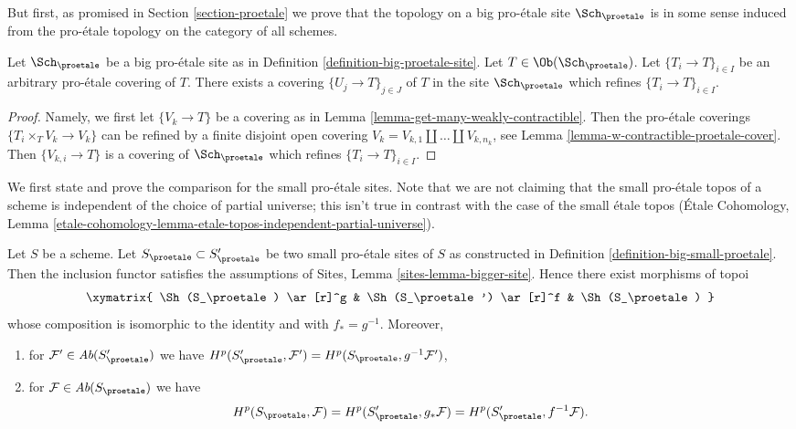 \medskip\noindent
But first, 
as promised in Section \ref{section-proetale} we prove that the topology on a
big pro-\'etale site $\Sch_\proetale$ is in some sense induced from
the pro-\'etale topology on the category of all schemes.

\begin{lemma}
\label{lemma-proetale-induced}
Let $\Sch_\proetale$ be a big pro-\'etale site as in
Definition \ref{definition-big-proetale-site}.
Let $T \in \Ob(\Sch_\proetale)$.
Let $\{T_i \to T\}_{i \in I}$ be an arbitrary pro-\'etale covering of $T$.
There exists a covering $\{U_j \to T\}_{j \in J}$ of $T$ in the site
$\Sch_\proetale$ which refines $\{T_i \to T\}_{i \in I}$.
\end{lemma}

\begin{proof}
Namely, we first let $\{V_k \to T\}$ be a covering as in
Lemma \ref{lemma-get-many-weakly-contractible}.
Then the pro-\'etale coverings $\{T_i \times_T V_k \to V_k\}$
can be refined by a finite disjoint open covering
$V_k = V_{k, 1} \amalg \ldots \amalg V_{k, n_k}$, see
Lemma \ref{lemma-w-contractible-proetale-cover}.
Then $\{V_{k, i} \to T\}$ is a covering of $\Sch_\proetale$
which refines $\{T_i \to T\}_{i \in I}$.
\end{proof}

\noindent
We first state and prove the comparison for the small pro-\'etale
sites. Note that we are not claiming that the small pro-\'etale topos
of a scheme is independent of the choice of partial universe; this isn't
true in contrast with the case of the small \'etale topos
(\'Etale Cohomology, Lemma
\ref{etale-cohomology-lemma-etale-topos-independent-partial-universe}).

\begin{lemma}
\label{lemma-proetale-cohomology-independent-partial-universe}
Let $S$ be a scheme. Let $S_\proetale \subset S_\proetale'$ be
two small pro-\'etale sites of $S$ as constructed in
Definition \ref{definition-big-small-proetale}. Then the inclusion functor
satisfies the assumptions of 
Sites, Lemma \ref{sites-lemma-bigger-site}.
Hence there exist morphisms of topoi
$$
\xymatrix{
\Sh(S_\proetale) \ar[r]^g &
\Sh(S_\proetale') \ar[r]^f &
\Sh(S_\proetale)
}
$$
whose composition is isomorphic to the identity and with $f_* = g^{-1}$.
Moreover,
\begin{enumerate}
\item for $\mathcal{F}' \in \textit{Ab}(S_\proetale')$ we have
$H^p(S_\proetale', \mathcal{F}') = H^p(S_\proetale, g^{-1}\mathcal{F}')$,
\item for $\mathcal{F} \in \textit{Ab}(S_\proetale)$ we have
$$
H^p(S_\proetale, \mathcal{F}) =
H^p(S_\proetale', g_*\mathcal{F}) =
H^p(S_\proetale', f^{-1}\mathcal{F}).
$$
\end{enumerate}
\end{lemma}

